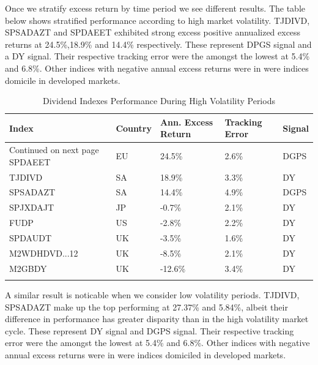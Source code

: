 \documentclass[11pt,preprint, authoryear]{elsarticle}
\numberwithin{equation}{section}
\numberwithin{figure}{section}
\numberwithin{table}{section}
\begin{document}
Once we stratify excess return by time period we see different results.
The table below shows stratified performance according to high market
volatility. TJDIVD, SPSADAZT and SPDAEET exhibited strong excess
positive annualized excess returns at 24.5\%,18.9\% and 14.4\%
respectively. These represent DPGS signal and a DY signal. Their
respective tracking error were the amongst the lowest at 5.4\% and
6.8\%. Other indices with negative annual excess returns were in were
indices domicile in developed markets.\\
\begingroup\fontsize{12pt}{13pt}\selectfont

\begin{longtable}{lllll}
  \toprule
Index & Country & Ann. Excess Return & Tracking Error & Signal \\ 
  \hline 
\endhead 
\hline 
{\footnotesize Continued on next page} 
\endfoot 
\endlastfoot 
 \midrule
SPDAEET & EU &  24.5\% & 2.6\% & DGPS \\ 
  TJDIVD & SA &  18.9\% & 3.3\% & DY \\ 
  SPSADAZT & SA &  14.4\% & 4.9\% & DGPS \\ 
  SPJXDAJT & JP &  -0.7\% & 2.1\% & DY \\ 
  FUDP & US &  -2.8\% & 2.2\% & DY \\ 
  SPDAUDT & UK &  -3.5\% & 1.6\% & DY \\ 
  M2WDHDVD...12 & UK &  -8.5\% & 2.1\% & DY \\ 
  M2GBDY & UK & -12.6\% & 3.4\% & DY \\ 
   \bottomrule
\caption{Dividend Indexes Performance During High Volatility Periods} 
\end{longtable}
\endgroup

A similar result is noticable when we consider low volatility periods.
TJDIVD, SPSADAZT make up the top performing at 27.37\% and 5.84\%,
albeit their difference in performance has greater disparity than in the
high volatility market cycle. These represent DY signal and DGPS signal.
Their respective tracking error were the amongst the lowest at 5.4\% and
6.8\%. Other indices with negative annual excess returns were in were
indices domiciled in developed markets.
\end{document}
